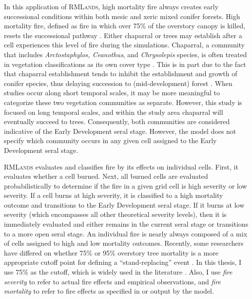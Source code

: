 In this application of \textsc{RMLands}, high mortality fire always creates early successional conditions within both mesic and xeric mixed conifer forests. High mortality fire, defined as fire in which over 75\% of the overstory canopy is killed, resets the successional pathway \citep{Agee1993}. Either chaparral or trees may establish after a cell experiences this level of fire during the simulations. Chaparral, a community that includes \emph{Arctostaphylos, Ceanothus}, and \emph{Chrysolepis} species, is often treated in vegetation classifications as its own cover type \citep{USDAForestService2008,VandeWater2011}. This is in part due to the fact that chaparral establishment tends to inhibit the establishment and growth of conifer species, thus delaying succession to (mid-development) forest \citep{Landfire2007}. When studies occur along short temporal scales, it may be more meaningful to categorize these two vegetation communities as separate. However, this study is focused on long temporal scales, and within the study area chaparral will eventually succeed to trees. Consequently, both communities are considered indicative of the Early Development seral stage. However, the model does not specify which community occurs in any given cell assigned to the Early Development seral stage.

\textsc{RMLands} evaluates and classifies fire by its effects on individual cells. First, it evaluates whether a cell burned. Next, all burned cells are evaluated probabilistically to determine if the fire in a given grid cell is high severity or low severity. If a cell burns at high severity, it is classified to a high mortality outcome and transitions to the Early Development seral stage. If it burns at low severity (which encompasses all other theoretical severity levels), then it is immediately evaluated and either remains in the current seral stage or transitions to a more open seral stage. An individual fire is nearly always composed of a mix of cells assigned to high and low mortality outcomes. Recently, some researchers have differed on whether 75\% or 95\% overstory tree mortality is a more appropriate cutoff point for defining a ``stand-replacing'' event \citep{Mallek2013,Fule2014}. In this thesis, I use 75\% as the cutoff, which is widely used in the literature \citep{Agee1993,Agee2007,Miller2009,Baker2014}. Also, I use \emph{fire severity} to refer to actual fire effects and empirical observations, and \emph{fire mortality} to refer to fire effects as specified in or output by the model.

